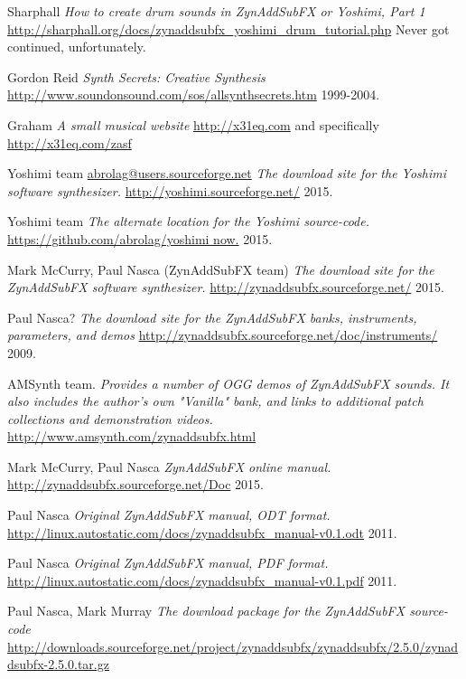 \begin{thebibliography}{99}
   Sharphall
   \emph{How to create drum sounds in ZynAddSubFX or Yoshimi, Part 1}
   \url{http://sharphall.org/docs/zynaddsubfx\_yoshimi\_drum\_tutorial.php}
   Never got continued, unfortunately.

   Gordon Reid
   \emph{Synth Secrets:  Creative Synthesis}
   \url{http://www.soundonsound.com/sos/allsynthsecrets.htm}
   1999-2004.

   Graham
   \emph{A small musical website}
   \url{http://x31eq.com} and specifically
   \url{http://x31eq.com/zasf}

   Yoshimi team \url{abrolag@users.sourceforge.net}
   \emph{The download site for the Yoshimi software synthesizer.}
   \url{http://yoshimi.sourceforge.net/}
   2015.

   Yoshimi team
   \emph{The alternate location for the Yoshimi source-code.}
   \url{https://github.com/abrolag/yoshimi now.}
   2015.

   Mark McCurry, Paul Nasca (ZynAddSubFX team)
   \emph{The download site for the ZynAddSubFX software synthesizer.}
   \url{http://zynaddsubfx.sourceforge.net/}
   2015.

   Paul Nasca?
   \emph{The download site for the ZynAddSubFX banks, instruments,
      parameters, and demos}
   \url{http://zynaddsubfx.sourceforge.net/doc/instruments/}
   2009.

   AMSynth team.
   \emph{Provides a number of OGG demos of ZynAddSubFX sounds. It
   also includes the author's own "Vanilla" bank, and links to additional
   patch collections and demonstration videos.}
   \url{http://www.amsynth.com/zynaddsubfx.html}

   Mark McCurry, Paul Nasca
   \emph{ZynAddSubFX online manual.}
   \url{http://zynaddsubfx.sourceforge.net/Doc}
   2015.

   Paul Nasca
   \emph{Original ZynAddSubFX manual, ODT format.}
   \url{http://linux.autostatic.com/docs/zynaddsubfx\_manual-v0.1.odt}
   2011.

   Paul Nasca
   \emph{Original ZynAddSubFX manual, PDF format.}
   \url{http://linux.autostatic.com/docs/zynaddsubfx\_manual-v0.1.pdf}
   2011.

   Paul Nasca, Mark Murray
   \emph{The download package for the ZynAddSubFX source-code}
   \url{http://downloads.sourceforge.net/project/zynaddsubfx/zynaddsubfx/2.5.0/zynaddsubfx-2.5.0.tar.gz}

\end{thebibliography}

